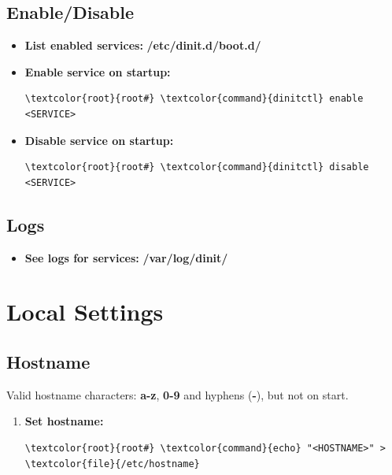 \documentclass[10pt, a4paper, onecolumn, oneside, titlepage, openany]{book}
\begin{document}
\section{Enable/Disable}
\begin{itemize}
    \item \textbf{List enabled services:}
\newline \textbf{\textcolor{dir}{/etc/dinit.d/boot.d/}}
    \item \textbf{Enable service on startup:}
\begin{Verbatim}[commandchars=\\\{\}]
\textcolor{root}{root#} \textcolor{command}{dinitctl} enable <SERVICE>
\end{Verbatim}
    \item \textbf{Disable service on startup:}
\begin{Verbatim}[commandchars=\\\{\}]
\textcolor{root}{root#} \textcolor{command}{dinitctl} disable <SERVICE>
\end{Verbatim}
\end{itemize}

\section{Logs}
\begin{itemize}
    \item \textbf{See logs for services:}
\newline \textbf{\textcolor{dir}{/var/log/dinit/}}
\end{itemize}


\chapter{Local Settings}
\section{Hostname}
Valid hostname characters: \textbf{a-z}, \textbf{0-9} and hyphens (\textbf{-}), but not on start.
\begin{enumerate}
    \item \textbf{Set hostname:}
\begin{Verbatim}[commandchars=\\\{\}]
\textcolor{root}{root#} \textcolor{command}{echo} "<HOSTNAME>" > \textcolor{file}{/etc/hostname}
\end{Verbatim}
\end{enumerate}
\end{document}
